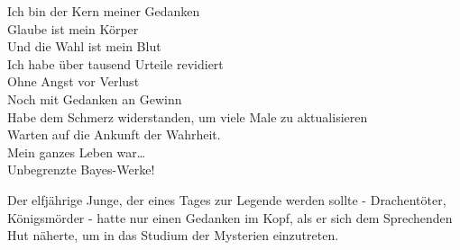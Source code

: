 \begin{emph}
Ich bin der Kern meiner Gedanken\\
Glaube ist mein Körper\\
Und die Wahl ist mein Blut\\
Ich habe über tausend Urteile revidiert\\
Ohne Angst vor Verlust\\
Noch mit Gedanken an Gewinn\\
Habe dem Schmerz widerstanden, um viele Male zu aktualisieren\\
Warten auf die Ankunft der Wahrheit.\\
Mein ganzes Leben war…\\
Unbegrenzte Bayes-Werke!\\
\end{emph}


Der elfjährige Junge, der eines Tages zur Legende werden sollte - Drachentöter, Königsmörder - hatte nur einen Gedanken im Kopf, als er sich dem Sprechenden Hut näherte, um in das Studium der Mysterien einzutreten.

